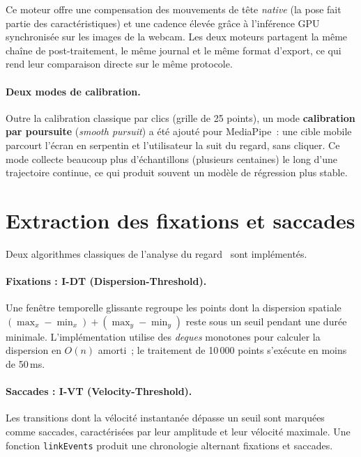 \documentclass[11pt,a4paper]{article}
\newcommand{\code}[1]{\texttt{\small #1}}
\begin{document}
Ce moteur offre une compensation des mouvements de tête \emph{native} (la pose fait
partie des caractéristiques) et une cadence élevée grâce à l'inférence GPU
synchronisée sur les images de la webcam. Les deux moteurs partagent la même chaîne
de post-traitement, le même journal et le même format d'export, ce qui rend leur
comparaison directe sur le même protocole.

\paragraph{Deux modes de calibration.} Outre la calibration classique par clics
(grille de 25 points), un mode \textbf{calibration par poursuite} (\emph{smooth
pursuit}) a été ajouté pour MediaPipe~: une cible mobile parcourt l'écran en
serpentin et l'utilisateur la suit du regard, sans cliquer. Ce mode collecte
beaucoup plus d'échantillons (plusieurs centaines) le long d'une trajectoire
continue, ce qui produit souvent un modèle de régression plus stable.

\section{Extraction des fixations et saccades}

Deux algorithmes classiques de l'analyse du regard~\cite{salvucci2000} sont
implémentés.

\paragraph{Fixations : I-DT (Dispersion-Threshold).} Une fenêtre temporelle
glissante regroupe les points dont la dispersion spatiale
$(\max_x - \min_x) + (\max_y - \min_y)$ reste sous un seuil pendant une durée
minimale. L'implémentation utilise des \textit{deques} monotones pour calculer la
dispersion en $O(n)$ amorti~; le traitement de 10\,000 points s'exécute en moins
de 50\,ms.

\paragraph{Saccades : I-VT (Velocity-Threshold).} Les transitions dont la vélocité
instantanée dépasse un seuil sont marquées comme saccades, caractérisées par leur
amplitude et leur vélocité maximale. Une fonction \code{linkEvents} produit une
chronologie alternant fixations et saccades.
\end{document}
